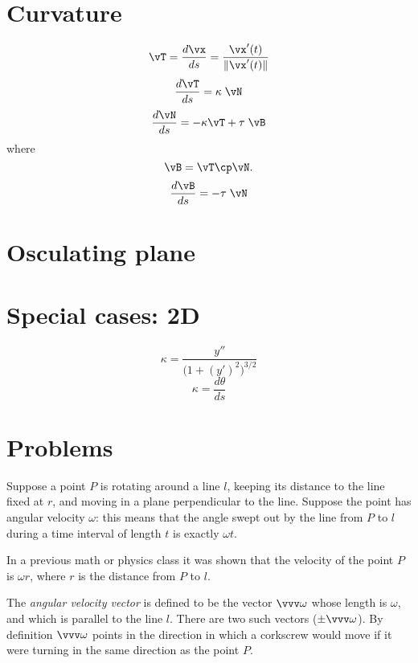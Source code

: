 \section{Curvature} %
\begin{equation}
  \vT = \frac{d\vx}{ds} = \frac{\vx'(t)}{\|\vx'(t)\|}
  \label{eq:unit-tangent-def}
\end{equation}
\begin{equation}
  \frac{d\vT}{ds} = \kappa\; \vN 
  \label{eq:first-Serret-Frenet}
\end{equation}
\begin{equation}
  \frac{d\vN}{ds} = -\kappa\vT + \tau\; \vB 
  \label{eq:second-Serret-Frenet}
\end{equation}
where
\[
\vB= \vT\cp\vN.
\]
\begin{equation}
  \frac{d\vB}{ds} = -\tau\; \vN 
  \label{eq:third-Serret-Frenet}
\end{equation}

\section{Osculating plane} %

\section{Special cases: 2D} %
\begin{equation}
  \kappa = \frac{y''}{\bigl(1+(y')^2\bigr)^{3/2}}
  \label{eq:curvature-of-graph}
\end{equation}
\begin{equation}
  \kappa = \frac{d\theta}{ds}
  \label{eq:curvature-is-deriv-of-tangentangle}
\end{equation}
\section{Problems} %
\problemfont
\problem Suppose a point $P$ is rotating around a line $l$, keeping %
its distance to the line fixed at $r$, and moving in a plane
perpendicular to the line.  Suppose the point has angular velocity
$\omega$: this means that the angle swept out by the line from $P$ to
$l$ during a time interval of length $t$ is exactly $\omega t$.

In a previous math or physics class it was shown that the velocity of
the point $P$ is $\omega r$, where $r$ is the distance from $P$ to
$l$.

The \emph{angular velocity vector} is defined to be the vector
$\vvv\omega$ whose length is $\omega$, and which is parallel to the
line $l$.  There are two such vectors ($\pm \vvv\omega$).  By
definition $\vvv\omega$ points in the direction in which a corkscrew
would move if it were turning in the same direction as the point $P$.

